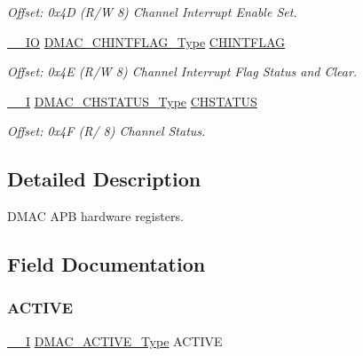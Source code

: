 \begin{DoxyCompactItemize}
\begin{DoxyCompactList}\small\item\em Offset\+: 0x4D (R/W 8) Channel Interrupt Enable Set. \end{DoxyCompactList}\item 
\mbox{\hyperlink{core__cm0plus_8h_aec43007d9998a0a0e01faede4133d6be}{\+\_\+\+\_\+\+IO}} \mbox{\hyperlink{union_d_m_a_c___c_h_i_n_t_f_l_a_g___type}{D\+M\+A\+C\+\_\+\+C\+H\+I\+N\+T\+F\+L\+A\+G\+\_\+\+Type}} \mbox{\hyperlink{struct_dmac_a70ede4f59f6bbe9db017cabb7d6e8a1e}{C\+H\+I\+N\+T\+F\+L\+AG}}
\begin{DoxyCompactList}\small\item\em Offset\+: 0x4E (R/W 8) Channel Interrupt Flag Status and Clear. \end{DoxyCompactList}\item 
\mbox{\hyperlink{core__cm0plus_8h_af63697ed9952cc71e1225efe205f6cd3}{\+\_\+\+\_\+I}} \mbox{\hyperlink{union_d_m_a_c___c_h_s_t_a_t_u_s___type}{D\+M\+A\+C\+\_\+\+C\+H\+S\+T\+A\+T\+U\+S\+\_\+\+Type}} \mbox{\hyperlink{struct_dmac_ab0c06a8ab70dab542d1320d903c643ba}{C\+H\+S\+T\+A\+T\+US}}
\begin{DoxyCompactList}\small\item\em Offset\+: 0x4F (R/ 8) Channel Status. \end{DoxyCompactList}\end{DoxyCompactItemize}


\subsection{Detailed Description}
D\+M\+AC A\+PB hardware registers. 

\subsection{Field Documentation}
\mbox{\label{struct_dmac_a9870bb49af321427ca8bdf49fa753ec2}} 
\subsubsection{\texorpdfstring{ACTIVE}{ACTIVE}}
{\footnotesize\ttfamily \mbox{\hyperlink{core__cm0plus_8h_af63697ed9952cc71e1225efe205f6cd3}{\+\_\+\+\_\+I}} \mbox{\hyperlink{union_d_m_a_c___a_c_t_i_v_e___type}{D\+M\+A\+C\+\_\+\+A\+C\+T\+I\+V\+E\+\_\+\+Type}} A\+C\+T\+I\+VE}



